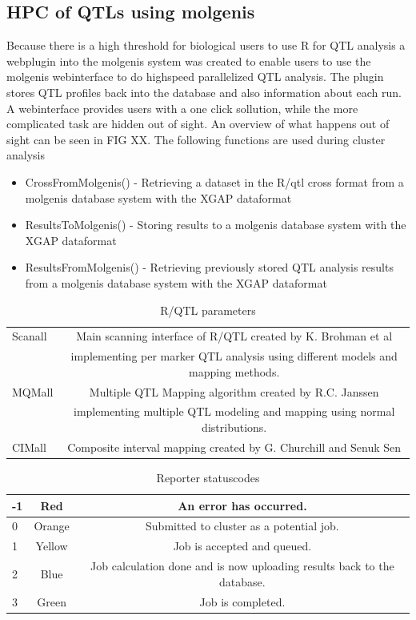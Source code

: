 \subsection{HPC of QTLs using molgenis}
Because there is a high threshold for biological users to use R for QTL analysis a webplugin into the molgenis system was created to enable users to 
use the molgenis webinterface to do highspeed parallelized QTL analysis. The plugin stores QTL profiles back into the database and also information about each run.
A webinterface provides users with a one click sollution, while the more complicated task are hidden out of sight. 
An overview of what happens out of sight can be seen in FIG XX.
The following functions are used during cluster analysis
\begin{itemize}
	\item CrossFromMolgenis() - Retrieving a dataset in the R/qtl cross format from a molgenis database system with the XGAP dataformat
	\item ResultsToMolgenis() - Storing results to a molgenis database system with the XGAP dataformat
	\item ResultsFromMolgenis() - Retrieving previously stored QTL analysis results from a molgenis database system with the XGAP dataformat
\end{itemize}

\begin{table}[ht]
	\caption{R/QTL parameters}
	\centering
	\begin{tabular}{| l | c | }
	\hline
	Scanall	&Main scanning interface of R/QTL created by K. Brohman et al\\
			&implementing per marker QTL analysis using different models and mapping methods.\\
	\hline
	MQMall	&Multiple QTL Mapping algorithm created by R.C. Janssen\\
			&implementing multiple QTL modeling and mapping using normal distributions.\\
	\hline
	CIMall	&Composite interval mapping created by G. Churchill and Senuk Sen\\
	\hline
	\end{tabular}
	\label{tbl:tabel0}
\end{table}

\begin{table}[ht]
	\caption{Reporter statuscodes}
	\centering
	\begin{tabular}{| l | c | c | }
	\hline
	-1	&Red	&An error has occurred.\\
	\hline
	0	&Orange	&Submitted to cluster as a potential job.\\
	\hline
	1	&Yellow	&Job is accepted and queued.\\
	\hline
	2	&Blue	&Job calculation done and is now uploading results back to the database.\\
	\hline
	3	&Green	&Job is completed.\\
	\hline
	\end{tabular}
	\label{tbl:tabel1}
\end{table}

